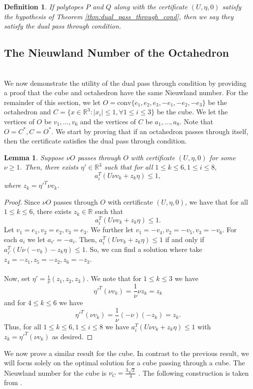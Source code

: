 \documentclass[a4paper]{amsart}
\newtheorem{lem}[thm]{Lemma}
\newtheorem{dfn}[thm]{Definition}
\theoremstyle{remark}
\begin{document}
\begin{dfn} 
If polytopes $P$ and $Q$ along with the certificate $(U, \eta, 0)$ satisfy the hypothesis of Theorem \ref{thm:dual_pass_through_cond}, then we say they satisfy the dual pass through condition.
\end{dfn}
\hfill
\subsection{The Nieuwland Number of the Octahedron}
\label{subsec: numocta}
\hfill \\
We now demonstrate the utility of the dual pass through condition by providing a proof that the cube and octahedron have the same Nieuwland number. For the remainder of this section, we let $O=\textrm{conv}\{e_1,e_2,e_3,-e_1,-e_2,-e_3\}$ be the octahedron and $C=\{x\in\mathbb{R}^3:|x_i|\leq1, \forall 1\leq i\leq3\}$ be the cube. We let the vertices of $O$ be $v_1,...,v_6$ and the vertices of $C$ be $a_1 ,..., a_8$. Note that $O=C^*, C=O^*$. We start by proving that if an octahedron passes through itself, then the certificate satisfies the dual pass through condition.
\begin{lem} \label{lem:vo_passthrough}
	Suppose $\nu O$ passes through $O$ with certificate $(U,\eta,0)$ for some $\nu\geq1$. Then, there exists $\eta'\in\mathbb{R}^3$ such that for all $1 \leq k \leq 6, 1 \leq i \leq 8,$
	$$a_i^T(U\nu v_k+z_k\eta)\leq 1,$$ where $z_k=\eta'^T\nu v_k$.
\end{lem}
\begin{proof}
	Since $\nu O$ passes through $O$ with certificate $(U,\eta,0)$, we have that for all $1 \leq k \leq 6$, there exists $z_k \in \mathbb{R}$ such that
	$$a_i^T(U\nu v_k+z_k\eta)\leq 1.$$
	Let $v_1=e_1,v_2=e_2,v_3=e_3$. We further let $v_1=-v_4, v_2=-v_5,v_3=-v_6$. For each $a_i$ we let $a_{i'}=-a_i$. Then, $a_i^T(U\nu v_k+z_k\eta)\leq1$ if and only if $a_{i'}^T(U\nu(-v_k)-z_k\eta)\leq1$. So, we can find a solution where take $z_4=-z_1, z_5=-z_2, z_6=-z_3$.
    \\\\
    Now, set $\eta'=\frac{1}{\nu}(z_1,z_2,z_3)$. We note that for $1\leq k\leq3$ we have $$\eta'^T(\nu v_k)=\frac{1}{\nu}\nu z_k=z_k$$ and for $4\leq k\leq6$ we have $$\eta'^T(\nu v_k)=\frac{1}{\nu}(-\nu) (-z_k)=z_k.$$ Thus, for all $1\leq k\leq 6, 1\leq i \leq 8$ we have $a_i^T(U\nu v_k+z_k\eta)\leq 1$ with $z_k=\eta'^T(\nu v_k)$ as desired.
\end{proof}
\noindent
We now prove a similar result for the cube. In contrast to the previous result, we will focus solely on the optimal solution for a cube passing through a cube. The Nieuwland number for the cube is $\nu_C=\frac{3\sqrt2}{4}$ \cite{StYu23}. The following construction is taken from \cite{Ga01}.\\
\end{document}

